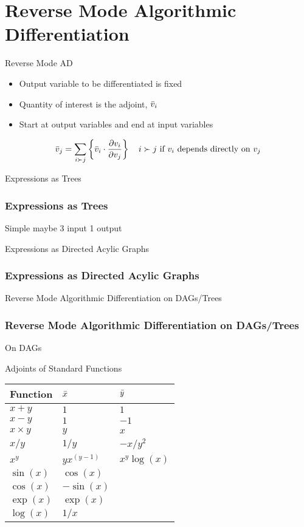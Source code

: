 \documentclass{beamer}
\begin{document}
\section{Reverse Mode Algorithmic Differentiation}


\begin{frame}{Reverse Mode AD}
    \begin{itemize}
        \item Output variable to be differentiated is fixed
        \item Quantity of interest is the \alert{adjoint}, $\Bar{v}_i$
        \item Start at output variables and end at input variables
    \end{itemize}
    \begin{equation*}
        \Bar{v}_j = \sum_{i \succ j} \left\{ \Bar{v}_i \cdot \frac{\partial v_i}{\partial v_j} \right\} \quad i \succ j  \text{ if } v_i \text{ depends directly on } v_j
    \end{equation*} 
\end{frame}

\begin{frame}{Expressions as Trees}
\frametitle{Expressions as Trees}
Simple maybe 3 input 1 output
\end{frame}

\begin{frame}{Expressions as Directed Acylic Graphs}
    \frametitle{Expressions as Directed Acylic Graphs}
\end{frame}

\begin{frame}{Reverse Mode Algorithmic Differentiation on DAGs/Trees}
\frametitle{Reverse Mode Algorithmic Differentiation on DAGs/Trees}
On DAGs
\end{frame}

\begin{frame}{Adjoints of Standard Functions}
    \begin{table}[h!]
    \centering
    \begin{tabular}{|lll|}
        \hline
        Function & $\Bar{x}$ & $\Bar{y}$ \\
        \hline
        $x+y$ & $1$ & $1$ \\
        $x-y$ & $1$ & $-1$ \\
        $x \times y$ & $y$ & $x$ \\
        $x / y$ & $1/y$ & $-x/y^2$ \\
        $x^y$ & $y{x}^{(y-1)}$ & ${x}^{y}\log(x)$ \\
        $\sin(x)$ & $\cos(x)$ &  \\
        $\cos(x)$ & $-\sin(x)$ &  \\
        $\exp(x)$ & $\exp(x)$ &  \\
        $\log(x)$ & $1/x$ &  \\
        \hline
    \end{tabular}
    \label{tab:Adjelementals}
    \end{table}
\end{frame}
\end{document}
